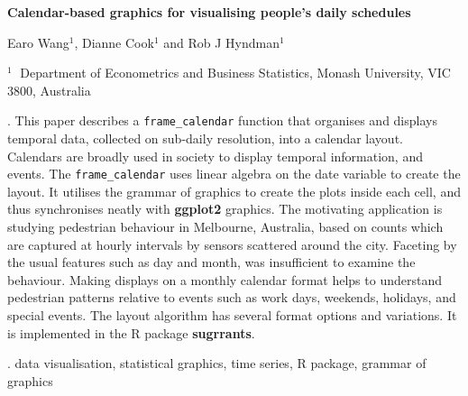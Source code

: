 \documentclass[12pt]{article}
\begin{document}
\begin{flushleft}


{\LARGE\bf Calendar-based graphics for visualising people's daily schedules}


\vspace{1.0cm}

Earo Wang$^1$, Dianne Cook$^1$ and Rob J Hyndman$^1$

\begin{description}

\item $^1 \;$ Department of Econometrics and Business Statistics,
Monash University, VIC 3800, Australia

\end{description}

\end{flushleft}


\vspace{0.75cm}

. This paper describes a \texttt{frame\_calendar} function that organises and displays temporal data, collected on sub-daily resolution, into a calendar layout. Calendars are broadly used in society to display temporal information, and events. The \texttt{frame\_calendar} uses linear algebra on the date variable to create the layout. It utilises the grammar of graphics to create the plots inside each cell, and thus synchronises neatly with {\bf ggplot2} graphics. The motivating application is studying pedestrian behaviour in Melbourne, Australia, based on counts which are captured at hourly intervals by sensors scattered around the city. Faceting by the usual features such as day and month, was insufficient to examine the behaviour. Making displays on a monthly calendar format helps to understand pedestrian patterns relative to events such as work days, weekends, holidays, and special events. The layout algorithm has several format options and variations. It is implemented in the R package {\bf sugrrants}.

\vskip 2mm

.
data visualisation, statistical graphics, time series, R package, grammar of graphics
\end{document}
